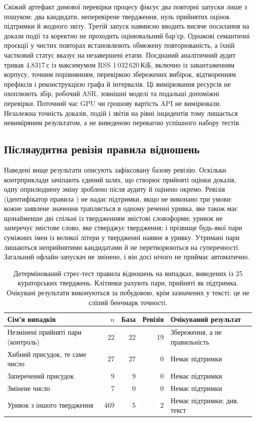 Свіжий артефакт димової перевірки процесу фіксує два повторні запуски лише з пошуком: два кандидати, неперевірене твердження, нуль прийнятих оцінок підтримки й жодного звіту. Третій запуск навмисно вводить висяче посилання на докази події та коректно не проходить оцінювальний бар'єр. Однакові семантичні проєкції у чистих повторах встановлюють обмежену повторюваність, а їхній частковий статус вказує на незавершені етапи. Поєднаний аналітичний аудит тривав 4,8317\,с із максимумом RSS 1\,032\,620\,КіБ, включно із завантаженням корпусу, точним порівнянням, перевіркою збережених вибірок, відтворенням префіксів і реконструкцією графа й інтервалів. Ці вимірювання ресурсів не охоплюють збір, робочий ASR, зовнішні моделі та подальші допоміжні перевірки. Поточний час GPU чи грошову вартість API не вимірювали. Незалежна точність доказів, подій і звітів на рівні інцидентів тому лишається невиміряним результатом, а не виведеною перевагою успішного набору тестів.

\subsection{Післяаудитна ревізія правила відношень}\label{sec:rule-v2}
Наведені вище результати описують зафіксовану базову ревізію. Оскільки контрприклади зачіпають єдиний шлях, що створює прийняті оцінки доказів, одну оприлюднену зміну зроблено після аудиту й оцінено окремо. Ревізія  (ідентифікатор правила ) не надає підтримки, якщо не виконано три умови: кожне заявлене значення трапляється в одному реченні уривка, яке також має щонайменше дві спільні із твердженням змістові словоформи; уривок не заперечує змістове слово, яке стверджує твердження; і прізвище будь-якої пари суміжних імен із великої літери у твердженні наявне в уривку. Утримані пари лишаються неприйнятими кандидатами й не перетворюються на суперечності. Загальний офлайн-запускач не змінено, і він досі нічого не приймає автоматично.

\begin{table}[!htbp]
\caption{Детермінований стрес-тест правила відношень на випадках, виведених із 25 кураторських тверджень. Клітинки рахують пари, прийняті як підтримка. Очікувані результати виконуються за побудовою, крім зазначених у тексті; це не сліпий бенчмарк точності.}\label{tab:rule-v2}
\centering\small
\begin{tabularx}{\textwidth}{@{}YrrrY@{}}
\toprule
Сім'я випадків & $n$ & База & Ревізія & Очікуваний результат\\
\midrule
Незмінені прийняті пари (контроль) & 22 & 22 & 19 & Збереження, а не правильність\\
Хибний присудок, те саме число & 27 & 27 & 0 & Немає підтримки\\
Заперечений присудок & 9 & 9 & 0 & Немає підтримки\\
Змінене число & 7 & 0 & 0 & Немає підтримки\\
Уривок з іншого твердження & 469 & 5 & 2 & Немає підтримки; див. текст\\
\bottomrule
\end{tabularx}
\end{table}

